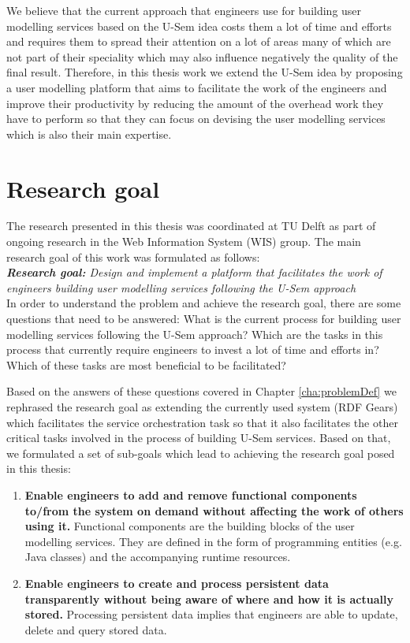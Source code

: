 We believe that the current approach that engineers use for building user modelling services based on the U-Sem idea costs them a lot of time and efforts and requires them to spread their attention on a lot of areas many of which are not part of their speciality which may also influence negatively the quality of the final result. Therefore, in this thesis work we extend the U-Sem idea by proposing a user modelling platform that aims to facilitate the work of the engineers and improve their productivity by reducing the amount of the overhead work they have to perform so that they can focus on devising the user modelling services which is also their main expertise.


\section{Research goal}

The research presented in this thesis was coordinated at TU Delft as part of ongoing research in the Web Information System (WIS) group. The main research goal of this work was formulated as follows:\\

\textit{\textbf{Research goal:} Design and implement a platform that facilitates the work of engineers building user modelling services following the U-Sem approach}\\

In order to understand the problem and achieve the research goal, there are some questions that need to be answered: What is the current process for building user modelling services following the U-Sem approach? Which are the tasks in this process that currently require engineers to invest a lot of time and efforts in? Which of these tasks are most beneficial to be facilitated? 

Based on the answers of these questions covered in Chapter \ref{cha:problemDef} we rephrased the research goal as extending the currently used system (RDF Gears) which facilitates the service orchestration task so that it also facilitates the other critical tasks involved in the process of building U-Sem services. Based on that, we formulated a set of sub-goals which lead to achieving the research goal posed in this thesis:

\begin{enumerate}
\item \textbf{Enable engineers to add and remove functional components to/from the system on demand without affecting the work of others using it.}
Functional components are the building blocks of the user modelling services. They are defined in the form of programming entities (e.g. Java classes) and the accompanying runtime resources.

\item \textbf{Enable engineers to create and process persistent data transparently without being aware of where and how it is actually stored.}
Processing persistent data implies that engineers are able to update, delete and query stored data.

\end{enumerate}

